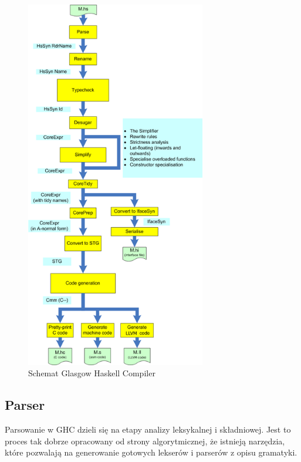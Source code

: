 \begin{figure}[H]
    \centering
    \includegraphics[width=0.7\textwidth]{images/AOSA_compiler}
    \caption[Schemat Glasgow Haskell Compiler]{Schemat Glasgow Haskell Compiler\cite{AOSA}}
    \label{fig:AOSA_compiler}
\end{figure}

\subsection{Parser}\label{sec:parser}
Parsowanie w GHC dzieli się na etapy analizy leksykalnej i składniowej. Jest to
proces tak dobrze opracowany od strony algorytmicznej, że istnieją narzędzia,
które pozwalają na generowanie gotowych lekserów i parserów z opisu gramatyki.

